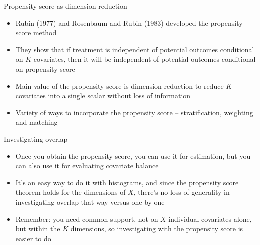 \documentclass{beamer}
\begin{document}
\begin{frame}{Propensity score as dimension reduction}
	
	\begin{itemize}

	\item Rubin (1977) and Rosenbaum and Rubin (1983) developed the propensity score method
	\item They show that if treatment is independent of potential outcomes conditional on $K$ covariates, then it will be independent of potential outcomes conditional on propensity score 
	\item Main value of the propensity score is dimension reduction  to reduce $K$ covariates into a single scalar without loss of information
	\item Variety of ways to incorporate the propensity score -- stratification, weighting and matching
	\end{itemize}
	
\end{frame}


\begin{frame}{Investigating overlap}

\begin{itemize}

\item Once you obtain the propensity score, you can use it for estimation, but you can also use it for evaluating covariate balance
\item It's an easy way to do it with histograms, and since the propensity score theorem holds for the dimensions of $X$, there's no loss of generality in investigating overlap that way versus one by one 
\item Remember: you need common support, not on $X$ individual covariates alone, but within the $K$ dimensions, so investigating with the propensity score is easier to do

\end{itemize}

\end{frame}
\end{document}
